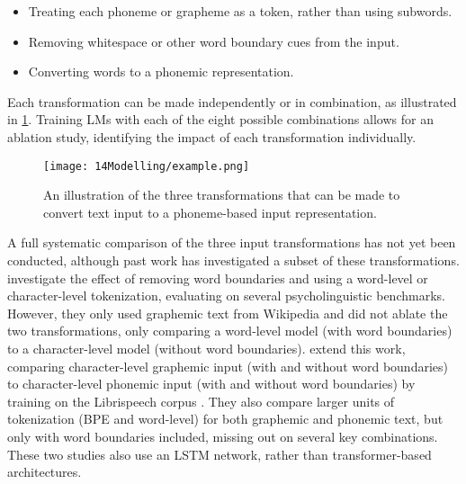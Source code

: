 \begin{itemize}
\setlength\itemsep{0.1em}
    \item {} Treating each phoneme or grapheme as a token, rather than using subwords.
    \item {} Removing whitespace or other word boundary cues from the input.
    \item {} Converting words to a phonemic representation. 
\end{itemize}

Each transformation can be made independently or in combination, as illustrated in \cref{fig:14-example}. Training LMs with each of the eight possible combinations allows for an ablation study, identifying the impact of each transformation individually. %

\begin{figure}[t]
    \centering
    \texttt{[image: 14Modelling/example.png]}
    \caption{An illustration of the three transformations that can be made to convert text input to a phoneme-based input representation.}
    \label{fig:14-example}
\end{figure}

A full systematic comparison of the three input transformations has not yet been conducted, although past work has investigated a subset of these transformations.  \citet{hahn-baroni-2019-tabula} investigate the effect of removing word boundaries and using a word-level or character-level tokenization, evaluating on several psycholinguistic benchmarks. However, they only used graphemic text from Wikipedia and did not ablate the two transformations, only comparing a word-level model (with word boundaries) to a character-level model (without word boundaries). \citet{nguyen-2022-word-boundaries} extend this work, comparing character-level graphemic input (with and without word boundaries) to character-level phonemic input (with and without word boundaries) by training on the Librispeech corpus \citep{panayotov2015librispeech}. They also compare larger units of tokenization (BPE and word-level) for both graphemic and phonemic text, but only with word boundaries included, missing out on several key combinations. These two studies also use an LSTM network, rather than transformer-based architectures.

